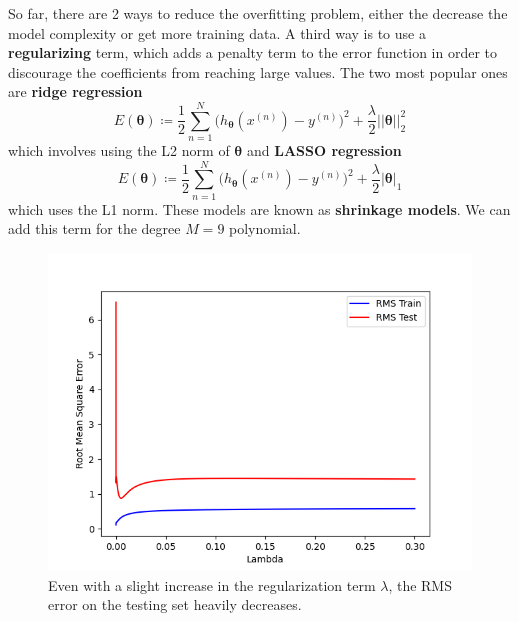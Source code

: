 \documentclass{article}
\theoremstyle{definition}
\begin{document}
    So far, there are 2 ways to reduce the overfitting problem, either the decrease the model complexity or get more training data. A third way is to use a \textbf{regularizing} term, which adds a penalty term to the error function in order to discourage the coefficients from reaching large values. The two most popular ones are \textbf{ridge regression} 
    \[E(\boldsymbol{\theta}) \coloneqq \frac{1}{2} \sum_{n=1}^N \big( h_{\boldsymbol{\theta}} (x^{(n)}) - y^{(n)} \big)^2 + \frac{\lambda}{2} ||\boldsymbol{\theta}||_2^2\]
    which involves using the L2 norm of $\boldsymbol{\theta}$ and \textbf{LASSO regression} 
    \[E(\boldsymbol{\theta}) \coloneqq \frac{1}{2} \sum_{n=1}^N \big( h_{\boldsymbol{\theta}} (x^{(n)}) - y^{(n)} \big)^2 + \frac{\lambda}{2} |\boldsymbol{\theta}|_1\]
    which uses the L1 norm. These models are known as \textbf{shrinkage models}. We can add this term for the degree $M=9$ polynomial. 
    \begin{figure}[hbt!]
        \centering
        \includegraphics[scale=0.5]{polynomial_first/Lambda_vs_RMS.png}
        \caption{Even with a slight increase in the regularization term $\lambda$, the RMS error on the testing set heavily decreases. }
        \label{fig:enter-label}
    \end{figure}
\end{document}
